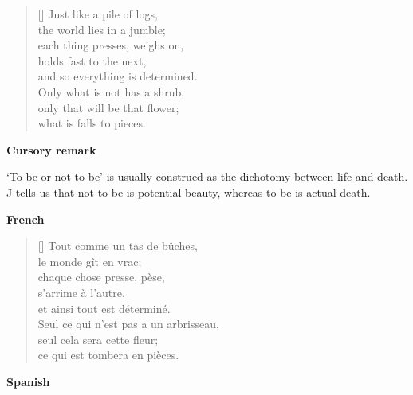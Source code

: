 \documentclass[a4paper,12pt,twoside,final]{book}
\begin{document}
\newpage



\settowidth{\versewidth}{and so everything is determined.}

\begin{verse}[\versewidth]
  Just like a pile of logs, \\
  the world lies in a jumble; \\
  each thing presses, weighs on, \\
  holds fast to the next, \\
  and so everything is determined. \\
  Only what is not has a shrub, \\
  only that will be that flower; \\
  what is falls to pieces. \\
\end{verse}

\bigskip

\noindent \textbf{Cursory remark}

\medskip

`To be or not to be' is usually construed as the dichotomy between
life and death. J tells us that not-to-be is potential beauty, whereas
to-be is actual death.

\bigskip

\noindent \textbf{French}


\settowidth{\versewidth}{Seul ce qui n'est pas a un arbrisseau,}

\begin{verse}[\versewidth]
  Tout comme un tas de bûches, \\
  le monde gît en vrac; \\
  chaque chose presse, pèse, \\
  s'arrime à l'autre, \\
  et ainsi tout est déterminé. \\
  Seul ce qui n'est pas a un arbrisseau, \\
  seul cela sera cette fleur; \\
  ce qui est tombera en pièces. \\
\end{verse}

\bigskip

\noindent \textbf{Spanish}

\end{document}
